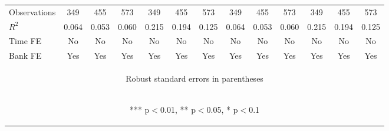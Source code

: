 \documentclass[]{article}
\begin{document}
\begin{center}
\begin{tabular}{lcccccccccccc}
Observations & 349 & 455 & 573 & 349 & 455 & 573 & 349 & 455 & 573 & 349 & 455 & 573 \\
$R^2$ & 0.064 & 0.053 & 0.060 & 0.215 & 0.194 & 0.125 & 0.064 & 0.053 & 0.060 & 0.215 & 0.194 & 0.125 \\
Time FE & No & No & No & No & No & No & No & No & No & No & No & No \\
 Bank FE & Yes & Yes & Yes & Yes & Yes & Yes & Yes & Yes & Yes & Yes & Yes & Yes \\ \hline
\multicolumn{13}{c}{\begin{footnotesize} Robust standard errors in parentheses\end{footnotesize}} \\
\multicolumn{13}{c}{\begin{footnotesize} *** p$<$0.01, ** p$<$0.05, * p$<$0.1\end{footnotesize}} \\
\end{tabular}
\end{center}
\end{document}

